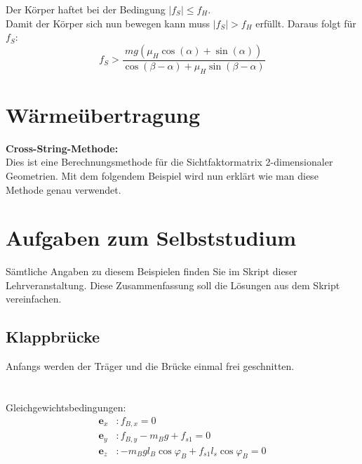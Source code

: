\documentclass[a4paper,12p]{article}
\begin{document}
\newline
Der Körper haftet bei der Bedingung \( |f_{S}|\leq f_{H}\).\\
Damit der Körper sich nun bewegen kann muss \(|f_{S}| > f_{H}\) erfüllt. Daraus folgt für \(f_{S}\):
\[
	f_{S} > \frac{mg(\mu_{H}\cos(\alpha) + \sin(\alpha))}{\cos(\beta - \alpha) + \mu_{H}\sin(\beta - \alpha)}
\] 

\section{Wärmeübertragung}
\textbf{Cross-String-Methode:} \\
Dies ist eine Berechnungsmethode für die Sichtfaktormatrix 2-dimensionaler Geometrien. Mit dem folgendem Beispiel wird nun erklärt wie man diese Methode genau verwendet. \\


\renewcommand\thesection{\Alph{section}} %
\setcounter{section}{1} %
\section{Aufgaben zum Selbststudium}
Sämtliche Angaben zu diesem Beispielen finden Sie im Skript dieser Lehrveranstaltung. Diese Zusammenfassung soll die Lösungen aus dem Skript vereinfachen.
\newpage
\subsection{Klappbrücke}
Anfangs werden der Träger und die Brücke einmal frei geschnitten. \\ \\

\\ Gleichgewichtsbedingungen:
\begin{align*}
	\textbf{e}_{x} &: f_{B,x} = 0 \\
	\textbf{e}_{y} &: f_{B,y} - m_Bg + f_{s1} = 0 \\
	\textbf{e}_{z} &: -m_Bgl_B\cos\varphi_B  + f_{s1}l_s\cos\varphi_B = 0
\end{align*}
\end{document}
